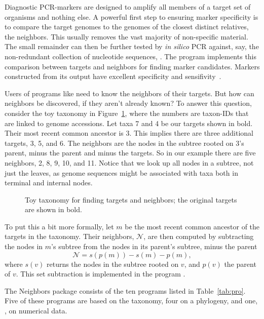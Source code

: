 Diagnostic PCR-markers are designed to amplify all members of a target
set of organisms and nothing else. A powerful first step to ensuring
marker specificity is to compare the target genomes to the genomes of
the closest distinct relatives, the neighbors. This usually removes
the vast majority of non-specific material. The small remainder can
then be further tested by \emph{in silico} PCR against, say, the
non-redundant collection of nucleotide sequences, . The
program  implements this comparison between targets and
neighbors for finding marker candidates. Markers constructed from its
output have excellent specificity and sensifivity~\cite{hau21:fur}.

Users of programs like  need to know the neighbors of their
targets. But how can neighbors be discovered, if they aren't already
known? To answer this question, consider the toy taxonomy in
Figure~\ref{fig:tax}, where the numbers are taxon-IDs that are linked
to genome accessions. Let taxa 7 and 4 be our targets shown in
bold. Their most recent common ancestor is 3. This implies there are
three additional targets, 3, 5, and 6. The neighbors are the nodes in
the subtree rooted on 3's parent, minus the parent and minus the
targets. So in our example there are five neighbors, 2, 8, 9, 10, and
11. Notice that we look up all nodes in a subtree, not just the
leaves, as genome sequences might be associated with taxa both in
terminal and internal nodes.

\begin{figure}
\begin{center}

\end{center}
\caption{Toy taxonomy for finding targets and neighbors; the original
targets are shown in bold.}\label{fig:tax}
\end{figure}

To put this a bit more formally, let $m$ be the most recent common
ancestor of the targets in the taxonomy. Their neighbors,
$\mathcal{N}$, are then computed by subtracting the nodes in $m$'s
subtree from the nodes in its parent's subtree, minus the parent
\begin{equation}\label{eq:nei}
\mathcal{N} = s(p(m)) - s(m) - p(m),
\end{equation}
where $s(v)$ returns the nodes in the subtree rooted on $v$, and
$p(v)$ the parent of $v$. This set subtraction is implemented in the
program .

The Neighbors package consists of the ten programs listed in
Table~\ref{tab:pro}. Five of these programs are based on the taxonomy,
four on a phylogeny, and one, , on numerical data.

